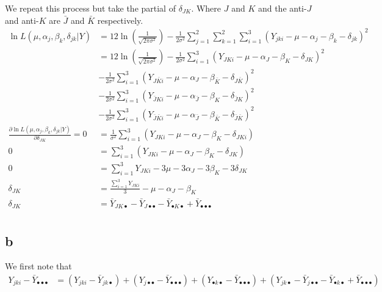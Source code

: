 \documentclass{article}
\begin{document}
We repeat this process but take the partial of $\delta_{JK}$. Where $J$ and $K$
and the anti-$J$ and anti-$K$ are $\bar{J}$ and $\bar{K}$ respectively.
\begin{align*}
    \ln L(\mu, \alpha_j, \beta_k, \delta_{jk} | Y)
    &=
    12 \ln\left(\frac{1}{\sqrt{2\pi\sigma^2}}\right)
    -\frac{1}{2\sigma^2}\sum_{j=1}^2\sum_{k=1}^2\sum_{i=1}^3
    (Y_{jki} - \mu - \alpha_j - \beta_k - \delta_{jk})^2 \\
    &=
    12 \ln\left(\frac{1}{\sqrt{2\pi\sigma^2}}\right)
    -\frac{1}{2\sigma^2}\sum_{i=1}^3
    (Y_{JKi} - \mu - \alpha_J - \beta_K - \delta_{JK})^2 \\
    &-\frac{1}{2\sigma^2}\sum_{i=1}^3
    (Y_{J\bar{K}i} - \mu - \alpha_J - \beta_{\bar{K}} - \delta_{J\bar{K}})^2 \\
    &-\frac{1}{2\sigma^2}\sum_{i=1}^3
    (Y_{\bar{J}Ki} - \mu - \alpha_{\bar{J}} - \beta_K - \delta_{\bar{J}K})^2 \\
    &-\frac{1}{2\sigma^2}\sum_{i=1}^3
    (Y_{\bar{J}\bar{K}i} - \mu - \alpha_{\bar{J}} - \beta_{\bar{K}} - \delta_{\bar{J}\bar{K}})^2 \\
    \frac{\partial\ln L(\mu, \alpha_j, \beta_k, \delta_{jk} | Y)}{\partial \delta_{JK}}
    = 0 &=
    \frac{1}{\sigma^2}\sum_{i=1}^3
    (Y_{JKi} - \mu - \alpha_J - \beta_K - \delta_{JKi}) \\
    0 &= \sum_{i=1}^3(Y_{JKi} - \mu - \alpha_J - \beta_K - \delta_{JK}) \\
    0 &= \sum_{i=1}^3Y_{JKi} - 3\mu - 3\alpha_J - 3\beta_K - 3\delta_{JK} \\
    \delta_{JK} &= \frac{\sum_{i=1}^3Y_{JKi}}{3} - \mu - \alpha_J - \beta_K \\
    \delta_{JK} &= \bar{Y}_{JK\bullet} - \bar{Y}_{J\bullet\bullet} - \bar{Y}_{\bullet K \bullet} + \bar{Y}_{\bullet\bullet\bullet} \\
\end{align*}

\subsection{b}
We first note that
\begin{align*}
    Y_{jki} - \bar{Y}_{\bullet\bullet\bullet}
    &=
    (Y_{jki} - \bar{Y}_{jk\bullet})
    + (Y_{j\bullet\bullet} - \bar{Y}_{\bullet\bullet\bullet})
    + (Y_{\bullet k \bullet} - \bar{Y}_{\bullet\bullet\bullet})
    + (Y_{jk\bullet} - \bar{Y}_{j\bullet\bullet} - \bar{Y}_{\bullet k \bullet} + \bar{Y}_{\bullet\bullet\bullet}) \\
\end{align*}
\end{document}
